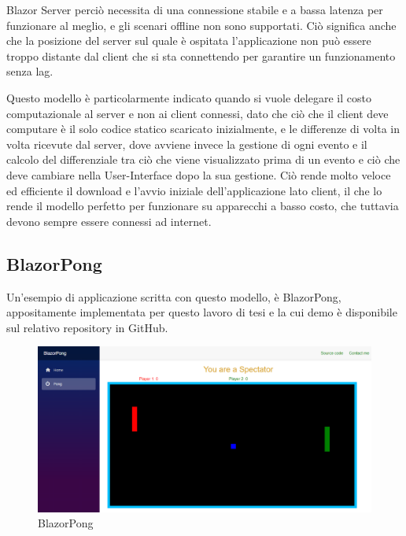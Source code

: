 Blazor Server perci\`o necessita di una connessione stabile e a bassa latenza per funzionare al meglio, e gli scenari offline non sono supportati.
Ci\`o significa anche che la posizione del server sul quale \`e ospitata l'applicazione non pu\`o essere troppo distante dal client che si sta connettendo per garantire un funzionamento senza lag.

Questo modello \`e particolarmente indicato quando si vuole delegare il costo computazionale al server e non ai client connessi, dato che ci\`o che il client deve computare \`e il solo codice statico scaricato inizialmente, e le differenze di volta in volta ricevute dal server, dove avviene invece la gestione di ogni evento e il calcolo del differenziale tra ci\`o che viene visualizzato prima di un evento e ci\`o che deve cambiare nella User-Interface dopo la sua gestione.
Ci\`o rende molto veloce ed efficiente il download e l'avvio iniziale dell'applicazione lato client, il che lo rende il modello perfetto per funzionare su apparecchi a basso costo, che tuttavia devono sempre essere connessi ad internet.

\subsection{BlazorPong }\label{sez:bpong}
Un'esempio di applicazione scritta con questo modello, \`e BlazorPong, appositamente implementata per questo lavoro di tesi e la cui demo \`e disponibile sul relativo repository in GitHub\cite{blazorPong}.

\begin{figure}[H]
	\centerline{\includegraphics[scale=0.3]{figure/BlazorPong.PNG}}
	\caption{BlazorPong}
	\label{fig:BlazorPong}
\end{figure}

